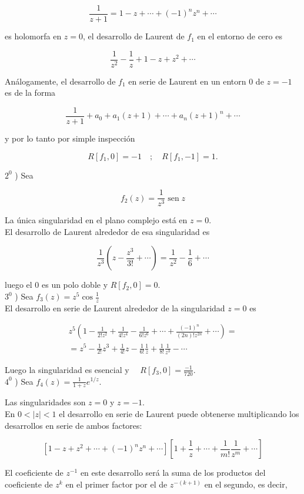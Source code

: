 \documentclass[10pt]{article}
\theoremstyle{plain}
\theoremstyle{definition}
\theoremstyle{remark}
\begin{document}
$$
\frac{1}{z+1}=1-z+\cdots+(-1)^{n} z^{n}+\cdots
$$

es holomorfa en $z=0$, el desarrollo de Laurent de $f_{1}$ en el entorno de cero es

$$
\frac{1}{z^{2}}-\frac{1}{z}+1-z+z^{2}+\cdots
$$

Análogamente, el desarrollo de $f_{1}$ en serie de Laurent en un entorn 0 de $z=-1$ es de la forma

$$
\frac{1}{z+1}+a_{0}+a_{1}(z+1)+\cdots+a_{n}(z+1)^{n}+\cdots
$$

y por lo tanto por simple inspección

$$
R\left[f_{1}, 0\right]=-1 \quad ; \quad R\left[f_{1},-1\right]=1 .
$$

$2^{0}$ ) Sea

$$
f_{2}(z)=\frac{1}{z^{3}} \operatorname{sen} z
$$

La única singularidad en el plano complejo está en $z=0$.\\
El desarrollo de Laurent alrededor de esa singularidad es

$$
\frac{1}{z^{3}}\left(z-\frac{z^{3}}{3!}+\cdots\right)=\frac{1}{z^{2}}-\frac{1}{6}+\cdots
$$

luego el 0 es un polo doble y $R\left[f_{2}, 0\right]=0$.\\
$3^{0}$ ) Sea $f_{3}(z)=z^{5} \cos \frac{1}{z}$\\
El desarrollo en serie de Laurent alrededor de la singularidad $z=0$ es

$$
\begin{gathered}
z^{5}\left(1-\frac{1}{2!z^{2}}+\frac{1}{4!z^{4}}-\frac{1}{6!z^{6}}+\cdots+\frac{(-1)^{n}}{(2 n)!z^{2 n}}+\cdots\right)= \\
=z^{5}-\frac{1}{2!} z^{3}+\frac{1}{4!} z-\frac{1}{6!} \frac{1}{z}+\frac{1}{8!} \frac{1}{z^{3}}-\cdots
\end{gathered}
$$

Luego la singularidad es esencial y $\quad R\left[f_{3}, 0\right]=\frac{-1}{720}$.\\
$4^{0}$ ) Sea $f_{4}(z)=\frac{1}{1+z} e^{1 / z}$.

Las singularidades son $z=0$ y $z=-1$.\\
En $0<|z|<1$ el desarrollo en serie de Laurent puede obtenerse multiplicando los desarrollos en serie de ambos factores:

$$
\left[1-z+z^{2}+\cdots+(-1)^{n} z^{n}+\cdots\right]\left[1+\frac{1}{z}+\cdots+\frac{1}{m!} \frac{1}{z^{m}}+\cdots\right]
$$

El coeficiente de $z^{-1}$ en este desarrollo será la suma de los productos del coeficiente de $z^{k}$ en el primer factor por el de $z^{-(k+1)}$ en el segundo, es decir,
\end{document}

